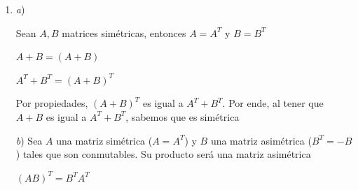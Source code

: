 \documentclass[11pt,a4paper]{article}
\begin{document}
\begin{enumerate}
$$
AC-(BD)^{T} = 
\begin{pmatrix} 
-6 & -1 \\
21  & 7 \\
\end{pmatrix}
+
\begin{pmatrix} 
-6 & -20 \\
7m+9  & -12 \\
\end{pmatrix}
$$

$$
z=
\begin{pmatrix} 
-12 & -21 \\
7m+30  & -5 \\
\end{pmatrix}
$$

Para que la matriz no sea invertible, su determinante es igual a 0. 

\begin{center}
    $det(z) = (12\cdot-5) - (-21\cdot(7m+30))$
    
    $0 = 60 + 630 + 147m$
    
    $-147m = 690$
    
    $m = \dfrac{690}{-147}$
\end{center}

Con esto, concluimos que $(AC-(BD)^{T})$ no es invertible siempre y cuando $m=\dfrac{690}{-147}$ dentro de la matriz $D$.


\item

\textit{a}) 

Sean $A, B$ matrices simétricas, entonces $A = A^{T}$ y $B = B^{T}$

\begin{center}
    $A + B = (A+B)$
    
    $A^{T} + B^{T} = (A+B)^{T}$
\end{center}

Por propiedades, $(A+B)^{T}$ es igual a $A^{T} + B^{T}$. Por ende, al tener que $A+B$ es igual a $A^{T} + B^{T}$, sabemos que es simétrica

\vspace{0.5cm}

\textit{b}) 
Sea $A$ una matriz simétrica ($A = A^{T}$) y $B$ una matriz asimétrica ($B^{T}=-B$) tales que son conmutables. Su producto será una matriz asimétrica

\begin{center}
    $(AB)^{T}= B^{T}A^{T}$


\end{center}
\end{enumerate}
\end{document}
